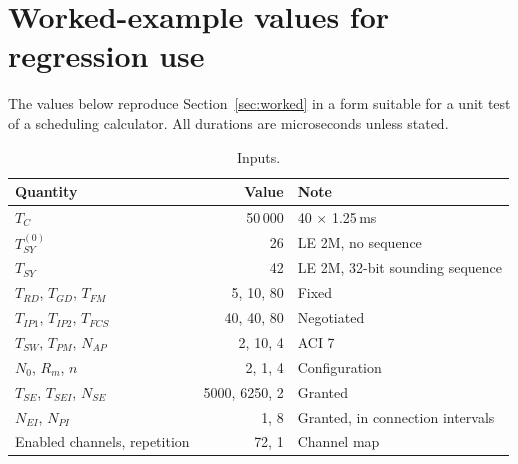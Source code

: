 \documentclass[11pt,a4paper]{article}
\newcommand{\Tsy}{T_{SY}}
\newcommand{\Trd}{T_{RD}}
\newcommand{\Tip}{T_{IP1}}
\newcommand{\Tipp}{T_{IP2}}
\newcommand{\Tfcs}{T_{FCS}}
\newcommand{\Tgd}{T_{GD}}
\newcommand{\Tfm}{T_{FM}}
\newcommand{\Tsw}{T_{SW}}
\newcommand{\Tpm}{T_{PM}}
\newcommand{\Nap}{N_{AP}}
\newcommand{\Tconn}{T_{C}}
\newcommand{\Tse}{T_{SE}}
\newcommand{\Tsei}{T_{SEI}}
\newcommand{\Nse}{N_{SE}}
\newcommand{\Nei}{N_{EI}}
\newcommand{\Npi}{N_{PI}}
\begin{document}
\section{Worked-example values for regression use}
\label{app:vectors}

The values below reproduce Section~\ref{sec:worked} in a form suitable for a unit test of a
scheduling calculator. All durations are microseconds unless stated.

\begin{table}[h]
\caption{Inputs.}
\label{tab:vec-in}
\centering\small
\begin{tabular}{@{}L{58mm}rL{48mm}@{}}
\toprule
Quantity & Value & Note \\
\midrule
$\Tconn$ & 50\,000 & 40 $\times$ 1.25\,ms \\
$\Tsy^{(0)}$ & 26 & LE 2M, no sequence \\
$\Tsy$ & 42 & LE 2M, 32-bit sounding sequence \\
$\Trd$, $\Tgd$, $\Tfm$ & 5, 10, 80 & Fixed \\
$\Tip$, $\Tipp$, $\Tfcs$ & 40, 40, 80 & Negotiated \\
$\Tsw$, $\Tpm$, $\Nap$ & 2, 10, 4 & ACI 7 \\
$N_0$, $R_m$, $n$ & 2, 1, 4 & Configuration \\
$\Tse$, $\Tsei$, $\Nse$ & 5000, 6250, 2 & Granted \\
$\Nei$, $\Npi$ & 1, 8 & Granted, in connection intervals \\
Enabled channels, repetition & 72, 1 & Channel map \\
\bottomrule
\end{tabular}
\end{table}
\end{document}
